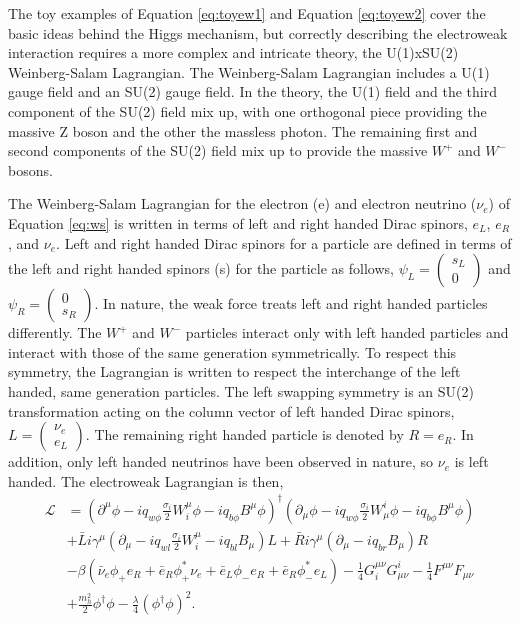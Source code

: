 The toy examples of Equation \ref{eq:toyew1} and Equation \ref{eq:toyew2} cover the basic ideas behind the Higgs mechanism, but correctly describing the electroweak interaction requires a more complex and intricate theory, the U(1)xSU(2) Weinberg-Salam Lagrangian. The Weinberg-Salam Lagrangian includes a U(1) gauge field and an SU(2) gauge field. In the theory, the U(1) field and the third component of the SU(2) field mix up, with one orthogonal piece providing the massive Z boson and the other the massless photon. The remaining first and second components of the SU(2) field mix up to provide the massive $W^+$ and $W^-$ bosons. 

The Weinberg-Salam Lagrangian for the electron (e) and electron neutrino ($\nu_e$) of Equation \ref{eq:ws} is written in terms of left and right handed Dirac spinors, $e_L$, $e_R$, and $\nu_e$. Left and right handed Dirac spinors for a particle are defined in terms of the left and right handed spinors (s) for the particle as follows, $\psi_L = \begin{pmatrix} s_L \\ 0 \end{pmatrix}$ and $\psi_R = \begin{pmatrix} 0 \\ s_R \end{pmatrix}$. In nature, the weak force treats left and right handed particles differently. The $W^+$ and $W^-$ particles interact only with left handed particles and interact with those of the same generation symmetrically. To respect this symmetry, the Lagrangian is written to respect the interchange of the left handed, same generation particles. The left swapping symmetry is an SU(2) transformation acting on the column vector of left handed Dirac spinors, $L = \begin{pmatrix} \nu_e \\ e_L \end{pmatrix}$. The remaining right handed particle is denoted by $R = e_R$. In addition, only left handed neutrinos have been observed in nature, so $\nu_e$ is left handed. The electroweak Lagrangian is then,  
\begin{equation}
\label{eq:ws}
\begin{split}
\mathcal{L} &= (\partial^\mu\phi - iq_{w\phi}\frac{\sigma_i}{2}W_i^\mu\phi - iq_{b\phi}B^\mu\phi)^\dagger
               (\partial_\mu\phi - iq_{w\phi}\frac{\sigma_i}{2}W^i_\mu\phi - iq_{b\phi}B^\mu\phi) \\ 
            &+ \bar{L}i\gamma^\mu(\partial_\mu - iq_{wl}\frac{\sigma_i}{2}W_i^\mu - iq_{bl}B_\mu)L + \bar{R}i\gamma^\mu(\partial_\mu - iq_{br}B_\mu)R \\
            &- \beta(\bar{\nu}_e\phi_+e_R + \bar{e}_R\phi_+^{*}\nu_e + \bar{e}_L\phi_-e_R + \bar{e}_R\phi_-^{*}e_L) 
             - \frac{1}{4}G_i^{\mu\nu}G^i_{\mu\nu} -\frac{1}{4}F^{\mu\nu}F_{\mu\nu} \\
            &+ \frac{m_h^2}{2}\phi^\dagger\phi - \frac{\lambda}{4}(\phi^\dagger\phi)^2.
\end{split}
\end{equation}
